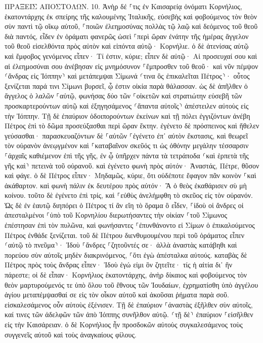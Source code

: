 \documentclass[twoside, 9pt]{extreport}
\begin{document}
ΠΡΑΞΕΙΣ ΑΠΟΣΤΟΛΩΝ.
10.
Ἀνὴρ δέ ⸀τις ἐν Καισαρείᾳ ὀνόματι Κορνήλιος, ἑκατοντάρχης ἐκ σπείρης τῆς καλουμένης Ἰταλικῆς, 
εὐσεβὴς καὶ φοβούμενος τὸν θεὸν σὺν παντὶ τῷ οἴκῳ αὐτοῦ, ⸀ποιῶν ἐλεημοσύνας πολλὰς τῷ λαῷ καὶ δεόμενος τοῦ θεοῦ διὰ παντός, 
εἶδεν ἐν ὁράματι φανερῶς ὡσεὶ ⸀περὶ ὥραν ἐνάτην τῆς ἡμέρας ἄγγελον τοῦ θεοῦ εἰσελθόντα πρὸς αὐτὸν καὶ εἰπόντα αὐτῷ· Κορνήλιε. 
ὁ δὲ ἀτενίσας αὐτῷ καὶ ἔμφοβος γενόμενος εἶπεν· Τί ἐστιν, κύριε; εἶπεν δὲ αὐτῷ· Αἱ προσευχαί σου καὶ αἱ ἐλεημοσύναι σου ἀνέβησαν εἰς μνημόσυνον ⸀ἔμπροσθεν τοῦ θεοῦ· 
καὶ νῦν πέμψον ⸂ἄνδρας εἰς Ἰόππην⸃ καὶ μετάπεμψαι Σίμωνά ⸂τινα ὃς ἐπικαλεῖται Πέτρος⸃· 
οὗτος ξενίζεται παρά τινι Σίμωνι βυρσεῖ, ᾧ ἐστιν οἰκία παρὰ θάλασσαν. 
ὡς δὲ ἀπῆλθεν ὁ ἄγγελος ὁ λαλῶν ⸀αὐτῷ, φωνήσας δύο τῶν ⸀οἰκετῶν καὶ στρατιώτην εὐσεβῆ τῶν προσκαρτερούντων αὐτῷ 
καὶ ἐξηγησάμενος ⸂ἅπαντα αὐτοῖς⸃ ἀπέστειλεν αὐτοὺς εἰς τὴν Ἰόππην. 
Τῇ δὲ ἐπαύριον ὁδοιπορούντων ἐκείνων καὶ τῇ πόλει ἐγγιζόντων ἀνέβη Πέτρος ἐπὶ τὸ δῶμα προσεύξασθαι περὶ ὥραν ἕκτην. 
ἐγένετο δὲ πρόσπεινος καὶ ἤθελεν γεύσασθαι· παρασκευαζόντων δὲ ⸀αὐτῶν ⸀ἐγένετο ἐπ᾽ αὐτὸν ἔκστασις, 
καὶ θεωρεῖ τὸν οὐρανὸν ἀνεῳγμένον καὶ ⸀καταβαῖνον σκεῦός τι ὡς ὀθόνην μεγάλην τέσσαρσιν ⸀ἀρχαῖς καθιέμενον ἐπὶ τῆς γῆς, 
ἐν ᾧ ὑπῆρχεν πάντα τὰ τετράποδα ⸂καὶ ἑρπετὰ τῆς γῆς καὶ⸃ πετεινὰ τοῦ οὐρανοῦ. 
καὶ ἐγένετο φωνὴ πρὸς αὐτόν· Ἀναστάς, Πέτρε, θῦσον καὶ φάγε. 
ὁ δὲ Πέτρος εἶπεν· Μηδαμῶς, κύριε, ὅτι οὐδέποτε ἔφαγον πᾶν κοινὸν ⸀καὶ ἀκάθαρτον. 
καὶ φωνὴ πάλιν ἐκ δευτέρου πρὸς αὐτόν· Ἃ ὁ θεὸς ἐκαθάρισεν σὺ μὴ κοίνου. 
τοῦτο δὲ ἐγένετο ἐπὶ τρίς, καὶ ⸀εὐθὺς ἀνελήμφθη τὸ σκεῦος εἰς τὸν οὐρανόν. 
Ὡς δὲ ἐν ἑαυτῷ διηπόρει ὁ Πέτρος τί ἂν εἴη τὸ ὅραμα ὃ εἶδεν, ⸀ἰδοὺ οἱ ἄνδρες οἱ ἀπεσταλμένοι ⸀ὑπὸ τοῦ Κορνηλίου διερωτήσαντες τὴν οἰκίαν ⸀τοῦ Σίμωνος ἐπέστησαν ἐπὶ τὸν πυλῶνα, 
καὶ φωνήσαντες ⸀ἐπυνθάνοντο εἰ Σίμων ὁ ἐπικαλούμενος Πέτρος ἐνθάδε ξενίζεται. 
τοῦ δὲ Πέτρου διενθυμουμένου περὶ τοῦ ὁράματος εἶπεν ⸂αὐτῷ τὸ πνεῦμα⸃· Ἰδοὺ ⸀ἄνδρες ⸀ζητοῦντές σε· 
ἀλλὰ ἀναστὰς κατάβηθι καὶ πορεύου σὺν αὐτοῖς μηδὲν διακρινόμενος, ⸀ὅτι ἐγὼ ἀπέσταλκα αὐτούς. 
καταβὰς δὲ Πέτρος πρὸς τοὺς ἄνδρας εἶπεν· Ἰδοὺ ἐγώ εἰμι ὃν ζητεῖτε· τίς ἡ αἰτία δι᾽ ἣν πάρεστε; 
οἱ δὲ εἶπαν· Κορνήλιος ἑκατοντάρχης, ἀνὴρ δίκαιος καὶ φοβούμενος τὸν θεὸν μαρτυρούμενός τε ὑπὸ ὅλου τοῦ ἔθνους τῶν Ἰουδαίων, ἐχρηματίσθη ὑπὸ ἀγγέλου ἁγίου μεταπέμψασθαί σε εἰς τὸν οἶκον αὐτοῦ καὶ ἀκοῦσαι ῥήματα παρὰ σοῦ. 
εἰσκαλεσάμενος οὖν αὐτοὺς ἐξένισεν. Τῇ δὲ ἐπαύριον ⸀ἀναστὰς ἐξῆλθεν σὺν αὐτοῖς, καί τινες τῶν ἀδελφῶν τῶν ἀπὸ Ἰόππης συνῆλθον αὐτῷ. 
⸂τῇ δὲ⸃ ἐπαύριον ⸀εἰσῆλθεν εἰς τὴν Καισάρειαν. ὁ δὲ Κορνήλιος ἦν προσδοκῶν αὐτοὺς συγκαλεσάμενος τοὺς συγγενεῖς αὐτοῦ καὶ τοὺς ἀναγκαίους φίλους. 
\end{document}
